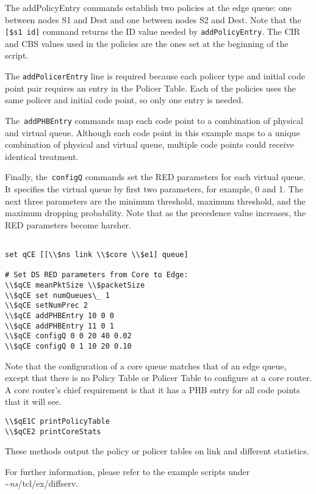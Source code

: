 The addPolicyEntry commands establish two policies at the edge queue: 
  one between nodes S1 and Dest and one between nodes S2 and Dest.  
Note that the {\tt [\$s1 id]} command returns the ID value 
  needed by {\tt addPolicyEntry}.  
The CIR and CBS values used in the policies are the ones set at 
  the beginning of the script.

The {\tt addPolicerEntry} line is required 
  because each policer type and initial code point pair requires 
  an entry in the Policer Table.  
Each of the policies uses the same policer and initial code point, 
  so only one entry is needed.

The~{\tt addPHBEntry} commands map each code point to 
  a combination of physical and virtual queue.
Although each code point in this example maps to 
  a unique combination of physical and virtual queue,
  multiple code points could receive identical treatment.

Finally, the~{\tt configQ} commands set the RED parameters for 
  each virtual queue.  
It specifies the virtual queue by first two parameters,
  for example, 0 and 1.
The next three parameters are the minimum threshold, maximum threshold,
  and the maximum dropping probability.
Note that as the precedence value increases, 
  the RED parameters become harsher.

\begin{verbatim}

set qCE [[\\$ns link \\$core \\$e1] queue]

# Set DS RED parameters from Core to Edge:
\\$qCE meanPktSize \\$packetSize
\\$qCE set numQueues\_ 1
\\$qCE setNumPrec 2
\\$qCE addPHBEntry 10 0 0
\\$qCE addPHBEntry 11 0 1
\\$qCE configQ 0 0 20 40 0.02
\\$qCE configQ 0 1 10 20 0.10

\end{verbatim}

Note that the configuration of a core queue matches that of an edge queue, 
  except that there is no Policy Table or Policer Table to 
  configure at a core router.  
A core router's chief requirement is that it has a PHB entry for 
  all code points that it will see.

\begin{verbatim}
\\$qE1C printPolicyTable
\\$qCE2 printCoreStats
\end{verbatim}

These methods output the policy or policer tables on link and different 
  statistics.  

For further information, please refer to the example scripts under 
\textasciitilde\emph{ns}/{tcl/ex/diffserv}.
